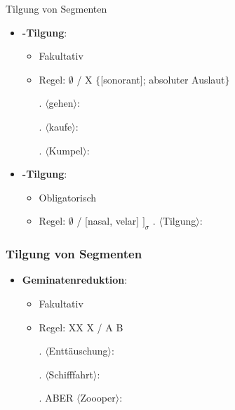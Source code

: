 \begin{frame}{Tilgung von Segmenten}

\begin{itemize}
	\item \textbf{-Tilgung}:
	
	\begin{itemize}
		\item Fakultativ
		\item Regel:  \ras $\emptyset$ / X \underline{\quad} $\{$[sonorant]; absoluter Auslaut$\}$

		\ex. $\langle$gehen$\rangle$:  \ras \textipa{[ge:n]}
		
		\ex. $\langle$kaufe$\rangle$:  \ras \textipa{[k\t{aU}f]}
		
		\ex. $\langle$Kumpel$\rangle$:  \ras {}

	\end{itemize}

	\item \textbf{-Tilgung}:
	
	\begin{itemize}
		\item Obligatorisch
		\item Regel:  \ras $\emptyset$ / [nasal, velar] \underline{\quad} $]_\sigma$
		\ex. $\langle$Tilgung$\rangle$:  \ras {}
		
	\end{itemize}
			
\end{itemize}

\end{frame}



\begin{frame}
\frametitle{Tilgung von Segmenten}

\begin{itemize}
	\item \textbf{Geminatenreduktion}:

	\begin{itemize}
		\item Fakultativ
		\item Regel: XX \ras X / A \underline{\quad} B

		\ex. $\langle$Enttäuschung$\rangle$:  \ras {}
		
		\ex. $\langle$Schifffahrt$\rangle$:  \ras \textipa{[SI\.fa:\;Rt]}
		
		\ex. ABER $\langle$Zoooper$\rangle$:  \ras \textipa{[\t{ts}o:.Po.p5]}
		
	\end{itemize}
	
\end{itemize}

\end{frame}



